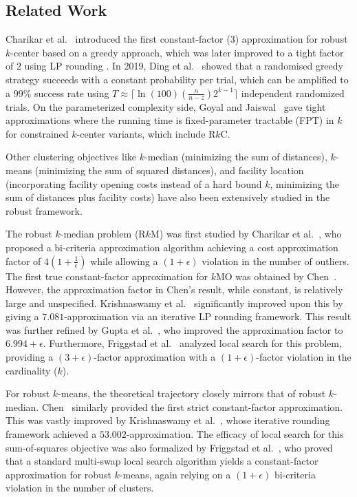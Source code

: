 \documentclass[twoside,leqno,twocolumn]{article}
\newcommand{\rkc}{R$k$C}
\begin{document}
\subsection{Related Work}
\label{sec:related}

Charikar et al.~\cite{charikar2001} introduced the first constant-factor ($3$) approximation for robust $k$-center based on a greedy approach, which was later improved to a tight factor of $2$ using LP rounding \cite{chakrabarty2016non,harris2017lottery}. In 2019, Ding et al.~\cite{ding2019} showed that a randomised greedy strategy succeeds with a constant probability per trial, which can be amplified to a $99\%$ success rate using $T \approx \lceil \ln(100) (\frac{n}{n-z}) 2^{k-1} \rceil$ independent randomized trials. On the parameterized complexity side, Goyal and Jaiswal~\cite{goyal2021} gave tight approximations where the running time is fixed-parameter tractable (FPT) in $k$ for constrained $k$-center variants, which include \rkc.

Other clustering objectives like $k$-median (minimizing the sum of distances), $k$-means (minimizing the sum of squared distances), and facility location (incorporating facility opening costs instead of a hard bound $k$, minimizing the sum of distances plus facility costs) have also been extensively studied in the robust framework.

The robust $k$-median problem (R$k$M) was first studied by Charikar et al.~\cite{charikar2001}, who proposed a bi-criteria approximation algorithm achieving a cost approximation factor of $4(1+\frac{1}{\epsilon})$ while allowing a $(1+\epsilon)$ violation in the number of outliers. The first true constant-factor approximation for $k$MO was obtained by Chen~\cite{chen2008}. However, the approximation factor in Chen's result, while constant, is relatively large and unspecified. Krishnaswamy et al.~\cite{krishnaswamy2017} significantly improved upon this by giving a $7.081$-approximation via an iterative LP rounding framework. This result was further refined by Gupta et al.~\cite{gupta2021}, who improved the approximation factor to $6.994 + \epsilon$. Furthermore, Friggstad et al.~\cite{friggstad2019} analyzed local search for this problem, providing a $(3+\epsilon)$-factor approximation with a $(1+\epsilon)$-factor violation in the cardinality ($k$).

For robust $k$-means, the theoretical trajectory closely mirrors that of robust $k$-median. Chen~\cite{chen2008} similarly provided the first strict constant-factor approximation. This was vastly improved by Krishnaswamy et al.~\cite{krishnaswamy2017}, whose iterative rounding framework achieved a $53.002$-approximation. The efficacy of local search for this sum-of-squares objective was also formalized by Friggstad et al.~\cite{friggstad2019}, who proved that a standard multi-swap local search algorithm yields a constant-factor approximation for robust $k$-means, again relying on a $(1+\epsilon)$ bi-criteria violation in the number of clusters.
\end{document}
